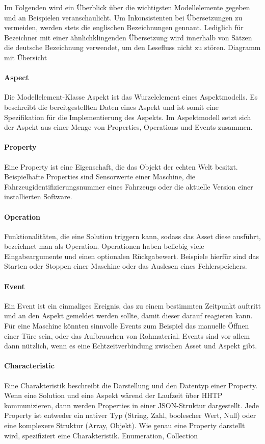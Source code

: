 	Im Folgenden wird ein Überblick über die wichtigsten Modellelemente gegeben und an Beispielen veranschaulicht. Um Inkonsistenten bei Übersetzungen zu vermeiden, werden stets die englischen Bezeichnungen gennant. Lediglich für Bezeichner mit einer ähnlichklingenden Übersetzung wird innerhalb von Sätzen die deutsche Bezeichnung verwendet, um den Lesefluss nicht zu stören.
	{\color{red} Diagramm mit Übersicht }

		\paragraph{Aspect} Die Modellelement-Klasse Aspekt ist das Wurzelelement eines Aspektmodells. Es beschreibt die bereitgestellten Daten eines Aspekt und ist somit eine Spezifikation für die Implementierung des Aspekts. Im Aspektmodell setzt sich der Aspekt aus einer Menge von Properties, Operations und Events zusammen.
		
		\paragraph{Property} Eine Property ist eine Eigenschaft, die das Objekt der echten Welt besitzt. Beispielhafte Properties sind Sensorwerte einer Maschine, die Fahrzeugidentifizierungsnummer eines Fahrzeugs oder die aktuelle Version einer installierten Software.
		
		\paragraph{Operation} Funktionalitäten, die eine Solution triggern kann, sodass das Asset diese ausführt, bezeichnet man als Operation. Operationen haben beliebig viele Eingabeargumente und einen optionalen Rückgabewert. Beispiele hierfür sind das Starten oder Stoppen einer Maschine oder das Auslesen eines Fehlerspeichers.
		
		\paragraph{Event} Ein Event ist ein einmaliges Ereignis, das zu einem bestimmten Zeitpunkt auftritt und an den Aspekt gemeldet werden sollte, damit dieser darauf reagieren kann. Für eine Maschine könnten sinnvolle Events zum Beispiel das manuelle Öffnen einer Türe sein, oder das Aufbrauchen von Rohmaterial. Events sind vor allem dann nützlich, wenn es eine Echtzeitverbindung zwischen Asset und Aspekt gibt.
		
		\paragraph{Characteristic} Eine Charakteristik beschreibt die Darstellung und den Datentyp einer Property. Wenn eine Solution und eine Aspekt wärend der Laufzeit über HHTP kommunizieren, dann werden Properties in einer JSON-Struktur dargestellt. Jede Property ist entweder ein nativer Typ (String, Zahl, boolescher Wert, Null) oder eine komplexere Struktur (Array, Objekt). Wie genau eine Property darstellt wird, spezifiziert eine Charakteristik. {\color{red} Enumeration, Collection}
		
